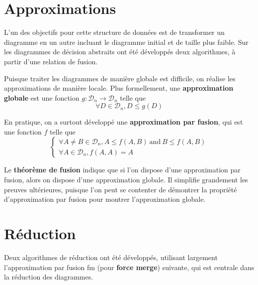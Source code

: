 \section{Approximations}

L'un des objectifs pour cette structure de données est de transformer un diagramme en un autre incluant le diagramme initial et de taille plus faible. Sur les diagrammes de décision abstraits ont été développés deux algorithmes, à partir d'une relation de fusion.

Puisque traiter les diagrammes de manière globale est difficile, on réalise les approximations de manière locale. Plus formellement, une \textbf{approximation globale} est une fonction $g : \mathcal D_n \to \mathcal D_n$ telle que
$$\forall D \in \mathcal D_n, D \le g(D)$$

En pratique, on a surtout développé une \textbf{approximation par fusion}, qui est une fonction $f$ telle que
$$\begin{cases}
  \forall A \not= B \in \mathcal{D}_n, A \le f(A, B)~\text{and}~B \le f(A, B) \\
  \forall A \in \mathcal{D}_n, f(A, A) = A
\end{cases}
$$

Le \textbf{théorème de fusion} indique que si l'on dispose d'une approximation par fusion, alors on dispose d'une approximation globale. Il simplifie grandement les preuves ultérieures, puisque l'on peut se contenter de démontrer la propriété d'approximation par fusion pour montrer l'approximation globale.

\section{Réduction}

Deux algorithmes de réduction ont été développés, utilisant largement l'approximation par fusion fm (pour \textbf{force merge}) suivante, qui est centrale dans la réduction des diagrammes.

